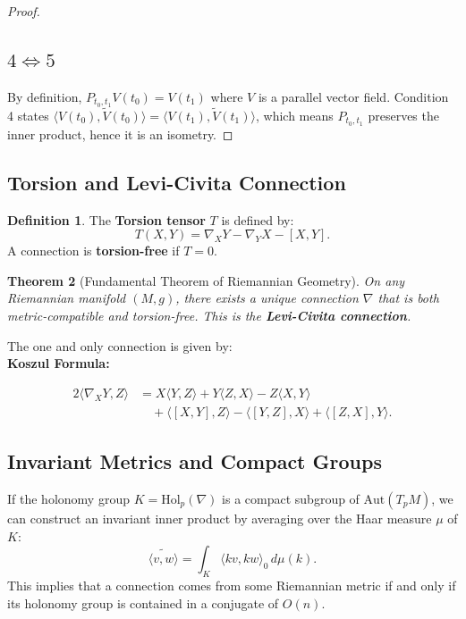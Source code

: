 \documentclass[11pt, a4paper]{article}
\theoremstyle{plain}
\newtheorem{theorem}{Theorem}[section]
\theoremstyle{definition}
\newtheorem{definition}[theorem]{Definition}
\theoremstyle{remark}
\begin{document}
\begin{proof}
\subsection*{$4 \iff 5$}
By definition, $P_{t_0, t_1} V(t_0) = V(t_1)$ where $V$ is a parallel vector field.
Condition 4 states $\langle V(t_0), \tilde{V}(t_0) \rangle = \langle V(t_1), \tilde{V}(t_1) \rangle$, which means $P_{t_0, t_1}$ preserves the inner product, hence it is an isometry.
\end{proof}


\subsection{Torsion and Levi-Civita Connection}

\begin{definition}
The \textbf{Torsion tensor} $T$ is defined by:
\[ T(X, Y) = \nabla_X Y - \nabla_Y X - [X, Y]. \]
A connection is \textbf{torsion-free} if $T = 0$.
\end{definition}

\begin{theorem}[Fundamental Theorem of Riemannian Geometry]
On any Riemannian manifold $(M, g)$, there exists a unique connection $\nabla$ that is both metric-compatible and torsion-free. This is the \textbf{Levi-Civita connection}.
\end{theorem}
The one and only connection is given by:\\
\textbf{Koszul Formula:}

\begin{align*}
2\langle \nabla_X Y, Z \rangle &= X\langle Y, Z \rangle + Y\langle Z, X \rangle - Z\langle X, Y \rangle \\
&\quad + \langle [X, Y], Z \rangle - \langle [Y, Z], X \rangle + \langle [Z, X], Y \rangle.
\end{align*}

\subsection{Invariant Metrics and Compact Groups}

If the holonomy group $K = \text{Hol}_p(\nabla)$ is a compact subgroup of $\text{Aut}(T_p M)$, we can construct an invariant inner product by averaging over the Haar measure $\mu$ of $K$:
\[ \widetilde{\langle v, w \rangle} = \int_K \langle kv, kw \rangle_0 \, d\mu(k). \]
This implies that a connection comes from some Riemannian metric if and only if its holonomy group is contained in a conjugate of $O(n)$.
\newpage
\end{document}
